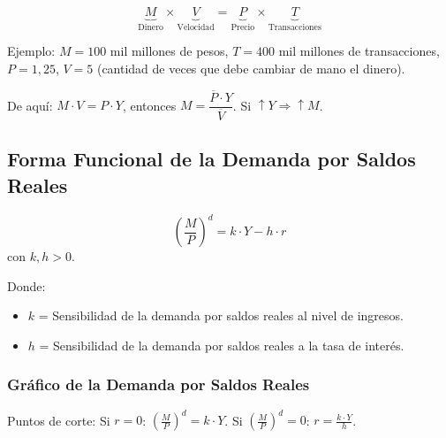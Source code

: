 \documentclass[11pt,a4paper]{article}
\newcommand{\barvar}[1]{\overline{#1}}
\begin{document}
\[
\underbrace{M}_{\text{Dinero}} \times \underbrace{V}_{\text{Velocidad}} = \underbrace{P}_{\text{Precio}} \times \underbrace{T}_{\text{Transacciones}}
\]

Ejemplo: $M = 100$ mil millones de pesos, $T = 400$ mil millones de transacciones, $P = 1{,}25$, $V = 5$ (cantidad de veces que debe cambiar de mano el dinero).

De aquí: $M \cdot V = P \cdot Y$, entonces $M = \dfrac{\barvar{P} \cdot Y}{\barvar{V}}$. Si $\uparrow Y \Rightarrow \uparrow M$.

\subsection{Forma Funcional de la Demanda por Saldos Reales}

\begin{resultadobox}
\begin{equation}
    \left(\frac{M}{P}\right)^d = k \cdot Y - h \cdot r \tag{1}
\end{equation}
con $k, h > 0$.
\end{resultadobox}

Donde:
\begin{itemize}
    \item $k$ = Sensibilidad de la demanda por saldos reales al nivel de ingresos.
    \item $h$ = Sensibilidad de la demanda por saldos reales a la tasa de interés.
\end{itemize}

\subsubsection{Gráfico de la Demanda por Saldos Reales}

Puntos de corte: Si $r = 0$: $\left(\frac{M}{P}\right)^d = k \cdot Y$. Si $\left(\frac{M}{P}\right)^d = 0$: $r = \frac{k \cdot Y}{h}$.
\end{document}

